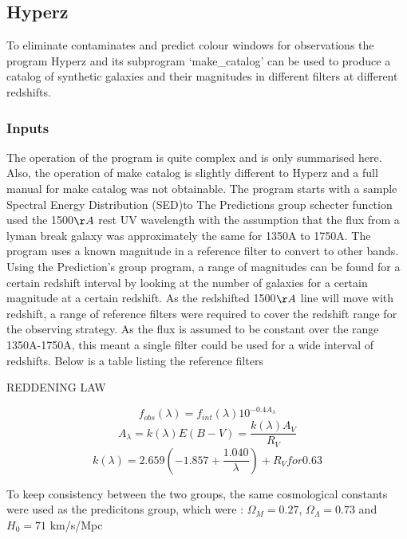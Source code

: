 
    \subsection{Hyperz} %
	\label{sub:Hyperz} 

To eliminate contaminates and predict colour windows for observations the program Hyperz and its subprogram ‘make\_catalog’ can be used to produce a catalog of synthetic galaxies and their magnitudes in different filters at different redshifts. 

         \subsubsection{Inputs} %
            \label{subsub:Hyperz_inputs}
The operation of the program is quite complex and is only summarised here. Also, the operation of make catalog is slightly different to Hyperz and a full manual for make catalog was not obtainable. The program starts with a sample Spectral Energy Distribution (SED)to  The Predictions group schecter function used the 1500$\AA$ rest UV wavelength with the assumption that the flux from a lyman break galaxy was approximately the same for 1350A to 1750A. The program uses a known magnitude in a reference filter to convert to other bands. Using the Prediction's group program, a range of magnitudes can be found for a certain redshift interval by looking at the number of galaxies for a certain magnitude at a certain redshift. As the redshifted 1500$\AA$ line will move with redshift, a range of reference filters were required to cover the redshift range for the observing strategy. As the flux is assumed to be constant over the range 1350A-1750A, this meant a single filter could be used for a wide interval of redshifts. Below is a table listing the reference filters


REDDENING LAW

\begin{equation}
f_{obs}(\lambda)=f_{int}(\lambda)10^{-0.4A_\lambda}
\end{equation}
\begin{equation}
A_\lambda=k(\lambda)E(B-V)=\frac{k(\lambda)A_V}{R_V}
\end{equation}
\begin{equation}
k(\lambda)=2.659(-1.857+\frac{1.040}{\lambda})+R_V for 0.63%
\end{equation}

To keep consistency between the two groups, the same cosmological constants were used as the predicitons group, which were : $\Omega_M=0.27$, $\Omega_\Lambda=0.73$ and $H_0=71$ km/s/Mpc  

